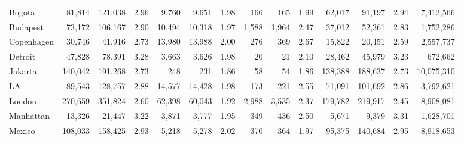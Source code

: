 \begin{table}[ht!]
\begin{adjustbox}{width=\textwidth,keepaspectratio}
\begin{tabular}{l|rrr|rrr|rrr|rrr|r}
			Bogota     & 81,814                          & 121,038                      & 2.96                      & 9,760                       & 9,651      & 1.98                & 166   & 165   & 1.99                & 62,017  & 91,197  & 2.94                  & 7,412,566  \\
			Budapest   & 73,172                          & 106,167                      & 2.90                      & 10,494                      & 10,318     & 1.97                & 1,588 & 1,964 & 2.47                & 37,012  & 52,361  & 2.83                  & 1,752,286  \\
			Copenhagen & 30,746                          & 41,916                       & 2.73                      & 13,980                      & 13,988     & 2.00                & 276   & 369   & 2.67                & 15,822  & 20,451  & 2.59                  & 2,557,737  \\
			Detroit    & 47,828                          & 78,391                       & 3.28                      & 3,663                       & 3,626      & 1.98                & 20    & 21    & 2.10                & 28,462  & 45,979  & 3.23                  & 672,662    \\
			Jakarta    & 140,042                         & 191,268                      & 2.73                      & 248                         & 231        & 1.86                & 58    & 54    & 1.86                & 138,388 & 188,637 & 2.73                  & 10,075,310 \\
			LA         & 89,543                          & 128,757                      & 2.88                      & 14,577                      & 14,428     & 1.98                & 173   & 221   & 2.55                & 71,091  & 101,692 & 2.86                  & 3,792,621  \\
			London     & 270,659                         & 351,824                      & 2.60                      & 62,398                      & 60,043     & 1.92                & 2,988 & 3,535 & 2.37                & 179,782 & 219,917 & 2.45                  & 8,908,081  \\
			Manhattan  & 13,326                          & 21,447                       & 3.22                      & 3,871                       & 3,777      & 1.95                & 349   & 436   & 2.50                & 5,671   & 9,379   & 3.31                  & 1,628,701  \\
			Mexico     & 108,033                         & 158,425                      & 2.93                      & 5,218                       & 5,278      & 2.02                & 370   & 364   & 1.97                & 95,375  & 140,684 & 2.95                  & 8,918,653  \\

\end{tabular}
\end{adjustbox}
\end{table}
